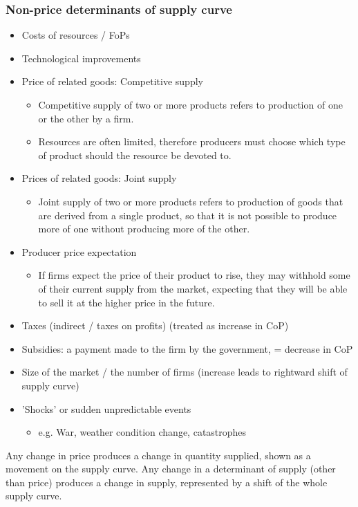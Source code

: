 \documentclass[a4paper,12pt]{article}
\begin{document}
\subsubsection*{Non-price determinants of supply curve}
\begin{itemize}
  \item Costs of resources / FoPs
  \item Technological improvements
  \item Price of related goods: Competitive supply
  \begin{itemize}
    \item Competitive supply of two or more products refers to production of one or the other by a firm.
    \item Resources are often limited, therefore producers must choose which type of product should the resource be devoted to.
  \end{itemize}
  \item Prices of related goods: Joint supply
  \begin{itemize}
    \item Joint supply of two or more products refers to production of goods that are derived from a single product, so that it is not possible to produce more of one without producing more of the other.
  \end{itemize}
  \item Producer price expectation
  \begin{itemize}
    \item If firms expect the price of their product to rise, they may withhold some of their current supply from the market, expecting that they will be able to sell it at the higher price in the future.
  \end{itemize}
  \item Taxes (indirect / taxes on profits) (treated as increase in CoP)
  \item Subsidies: a payment made to the firm by the government, = decrease in CoP
  \item Size of the market / the number of firms (increase leads to rightward shift of supply curve)
  \item 'Shocks' or sudden unpredictable events
  \begin{itemize}
    \item e.g. War, weather condition change, catastrophes
  \end{itemize}
\end{itemize}
Any change in price produces a change in quantity supplied, shown as a movement on the supply curve. Any change in a determinant of supply (other than price) produces a change in supply, represented by a shift of the whole supply curve.
\end{document}
